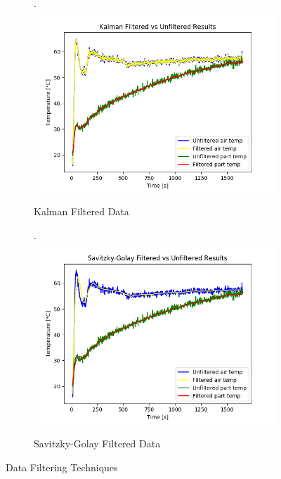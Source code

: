\begin{figure}[h]
    \begin{subfigure}{.5\linewidth}.
        \centering
    	\includegraphics[width=1\linewidth]{filter/kalman.png}
        \caption{Kalman Filtered Data}
        \label{fig:kalman}
    \end{subfigure}
    \begin{subfigure}{.5\linewidth}.
        \centering
    	\includegraphics[width=1\linewidth]{filter/savitzky.png}
        \caption{Savitzky-Golay Filtered Data}
    	\label{fig:savitzky}
    \end{subfigure}
    \caption{Data Filtering Techniques}
\end{figure}
